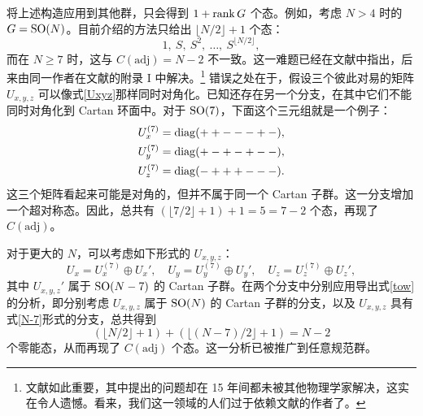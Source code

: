 将上述构造应用到其他群，只会得到 $1+\mathop{\mathrm{rank}} G$ 个态。例如，考虑 $N>4$ 时的 $G=\mathop{\mathrm{SO}}(N)$。目前介绍的方法只给出 $\lfloor N/2\rfloor+1$ 个态：
\begin{equation}
1,\ S,\ S^2,\ \ldots,\ S^{\lfloor N/2\rfloor},
\end{equation}
而在 $N\ge7$ 时，这与 $C(\text{adj})=N-2$ 不一致。这一难题已经在文献\cite{Witten:1982df}中指出，后来由同一作者在文献\cite{Witten:1997bs}的附录 I 中解决。\footnote{文献\cite{Witten:1982df}如此重要，其中提出的问题却在 15 年间都未被其他物理学家解决，这实在令人遗憾。看来，我们这一领域的人们过于依赖文献\cite{Witten:1982df,Witten:1997bs}的作者了。} 错误之处在于，假设三个彼此对易的矩阵 $U_{x,y,z}$ 可以像式\eqref{Uxyz}那样同时对角化。已知还存在另一个分支，在其中它们不能同时对角化到 Cartan 环面中。对于 $\mathop{\mathrm{SO}}(7)$，下面这个三元组就是一个例子：
\begin{align}
U_x^{(7)}&=\mathop{\mathrm{diag}}(++---+-),\\
U_y^{(7)}&=\mathop{\mathrm{diag}}(+-+-+--),\\
U_z^{(7)}&=\mathop{\mathrm{diag}}(-+++---).
\end{align}
这三个矩阵看起来可能是对角的，但并不属于同一个 Cartan 子群。这一分支增加一个超对称态。因此，总共有 $(\lfloor7/2\rfloor+1)+1=5=7-2$ 个态，再现了 $C(\text{adj})$。

对于更大的 $N$，可以考虑如下形式的 $U_{x,y,z}$：
\begin{equation}
U_x=U_x^{(7)} \oplus U_x',\quad
U_y=U_y^{(7)} \oplus U_y',\quad
U_z=U_z^{(7)} \oplus U_z',\label{N-7}
\end{equation}
其中 $U_{x,y,z}'$ 属于 $\mathop{\mathrm{SO}}(N-7)$ 的 Cartan 子群。在两个分支中分别应用导出式\eqref{tow}的分析，即分别考虑 $U_{x,y,z}$ 属于 $\mathop{\mathrm{SO}}(N)$ 的 Cartan 子群的分支，以及 $U_{x,y,z}$ 具有式\eqref{N-7}形式的分支，总共得到
\begin{equation}
(\lfloor N/2\rfloor+1)+(\lfloor (N-7)/2\rfloor+1) = N-2
\end{equation}
个零能态，从而再现了 $C(\text{adj})$ 个态。这一分析已被推广到任意规范群\cite{Kac:1999gw,BorelFreedmanMorgan}。
